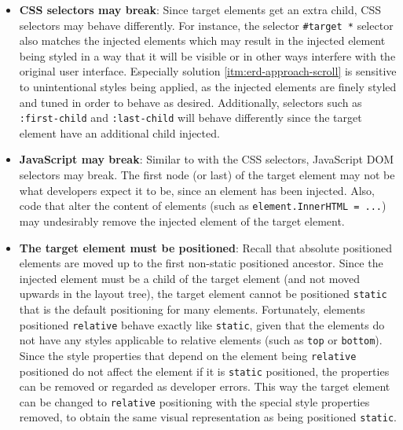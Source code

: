 \documentclass[a4paper,11pt]{kth-mag}
\newcommand{\code}[1]{\texttt{#1}}
\begin{document}
        \begin{itemize}
          \item \textbf{\gls{CSS} selectors may break}:
            Since target \glspl{element} get an extra child, \gls{CSS} selectors may behave differently.
            For instance, the selector \code{\#target *} selector also matches the injected \glspl{element} which may result in the injected element being styled in a way that it will be visible or in other ways interfere with the original user interface.
            Especially solution \ref{itm:erd-approach-scroll} is sensitive to unintentional styles being applied, as the injected elements are finely styled and tuned in order to behave as desired.
            Additionally, selectors such as \code{:first-child} and \code{:last-child} will behave differently since the target element have an additional child injected.
          \item \textbf{\gls{JavaScript} may break}:
            Similar to with the \gls{CSS} selectors, \gls{JavaScript} \gls{DOM} selectors may break.
            The first node (or last) of the target \gls{element} may not be what developers expect it to be, since an \gls{element} has been injected.
            Also, code that alter the content of \glspl{element} (such as \code{element.InnerHTML = ...}) may undesirably remove the injected \gls{element} of the target element.
          \item \textbf{The target \gls{element} must be positioned}:
            Recall that absolute positioned \glspl{element} are moved up to the first non-static positioned ancestor.
            Since the injected element must be a child of the target \gls{element} (and not moved upwards in the layout tree), the target \gls{element} cannot be positioned \code{static} that is the default positioning for many \glspl{element}.
            Fortunately, \glspl{element} positioned \code{relative} behave exactly like \code{static}, given that the \glspl{element} do not have any styles applicable to relative elements (such as \code{top} or \code{bottom}).
            Since the style properties that depend on the \gls{element} being \code{relative} positioned do not affect the \gls{element} if it is \code{static} positioned, the properties can be removed or regarded as developer errors.
            This way the target \gls{element} can be changed to \code{relative} positioning with the special style properties removed, to obtain the same visual representation as being positioned \code{static}.
        \end{itemize}
\end{document}
